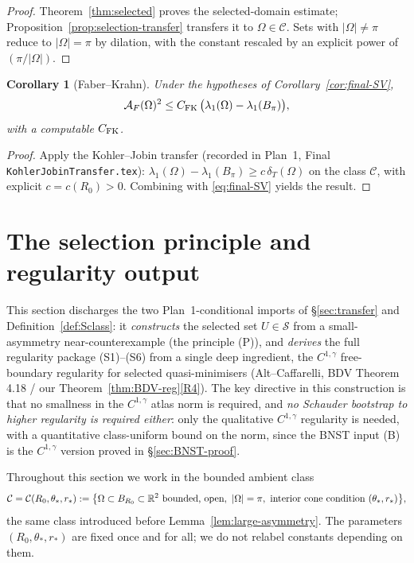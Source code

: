 \documentclass[11pt]{amsart}
\newtheorem{corollary}[theorem]{Corollary}
\newcommand{\R}{\mathbb R}
\newcommand{\dT}{\delta_T}
\newcommand{\AF}{\mathcal A_F}
\newcommand{\Sclass}{\mathcal S}
\begin{document}
\begin{proof}
Theorem~\ref{thm:selected} proves the selected-domain estimate;
Proposition~\ref{prop:selection-transfer} transfers it to
\(\Omega\in\mathcal C\).  Sets with \(|\Omega|\ne\pi\) reduce to
\(|\Omega|=\pi\) by dilation, with the constant rescaled by an
explicit power of \((\pi/|\Omega|)\).
\end{proof}

\begin{corollary}[Faber--Krahn]\label{cor:FK}
Under the hypotheses of Corollary~\ref{cor:final-SV},
\[
   \AF(\Omega)^2\le C_{\rm FK}\,\bigl(\lambda_1(\Omega)
      -\lambda_1(B_\pi)\bigr),
\]
with a computable \(C_{\rm FK}\).
\end{corollary}

\begin{proof}
Apply the Kohler--Jobin transfer (recorded in Plan~1, Final
\texttt{KohlerJobinTransfer.tex}): \(\lambda_1(\Omega)-\lambda_1(B_\pi)
\ge c\,\dT(\Omega)\) on the class \(\mathcal C\), with explicit
\(c=c(R_0)>0\).  Combining with \eqref{eq:final-SV} yields the
result.
\end{proof}

\section{The selection principle and regularity output}
\label{sec:selection-package}

This section discharges the two Plan~1-conditional imports of
\S\ref{sec:transfer} and Definition~\ref{def:Sclass}: it
\emph{constructs} the selected set $U\in\Sclass$ from a
small-asymmetry near-counterexample (the principle (P)), and
\emph{derives} the full regularity package (S1)--(S6) from a single
deep ingredient, the $C^{1,\gamma}$ free-boundary regularity for
selected quasi-minimisers (Alt--Caffarelli, BDV Theorem 4.18 / our
Theorem~\ref{thm:BDV-reg}\ref{R4}).  The key directive in this
construction is that no smallness in the $C^{1,\gamma}$ atlas norm
is required, and \emph{no Schauder bootstrap to higher regularity is
required either}: only the qualitative $C^{1,\gamma}$ regularity is
needed, with a quantitative class-uniform bound on the norm, since
the BNST input (B) is the $C^{1,\gamma}$ version proved in
\S\ref{sec:BNST-proof}.

Throughout this section we work in the bounded ambient class
\[
   \mathcal C=\mathcal C(R_0,\theta_*,r_*)
   :=\bigl\{\Omega\subset B_{R_0}\subset\R^2\hbox{ bounded, open},\
      |\Omega|=\pi,\ \hbox{interior cone condition }
         (\theta_*,r_*)\bigr\},
\]
the same class introduced before Lemma~\ref{lem:large-asymmetry}.  The
parameters \((R_0,\theta_*,r_*)\) are fixed once and for all; we do not
relabel constants depending on them.
\end{document}
